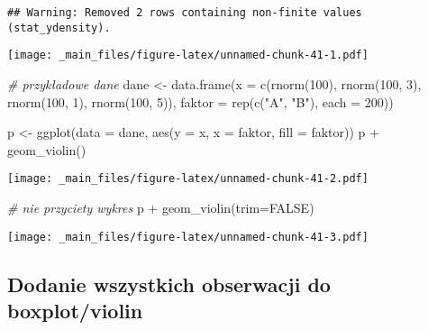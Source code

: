 \documentclass[
]{book}
\newenvironment{Shaded}{\begin{snugshade}}{\end{snugshade}}
\newcommand{\AttributeTok}[1]{\textcolor[rgb]{0.77,0.63,0.00}{#1}}
\newcommand{\CommentTok}[1]{\textcolor[rgb]{0.56,0.35,0.01}{\textit{#1}}}
\newcommand{\ConstantTok}[1]{\textcolor[rgb]{0.00,0.00,0.00}{#1}}
\newcommand{\DecValTok}[1]{\textcolor[rgb]{0.00,0.00,0.81}{#1}}
\newcommand{\FunctionTok}[1]{\textcolor[rgb]{0.00,0.00,0.00}{#1}}
\newcommand{\NormalTok}[1]{#1}
\newcommand{\OtherTok}[1]{\textcolor[rgb]{0.56,0.35,0.01}{#1}}
\newcommand{\SpecialCharTok}[1]{\textcolor[rgb]{0.00,0.00,0.00}{#1}}
\newcommand{\StringTok}[1]{\textcolor[rgb]{0.31,0.60,0.02}{#1}}
\begin{document}
\begin{verbatim}
## Warning: Removed 2 rows containing non-finite values (stat_ydensity).
\end{verbatim}

\texttt{[image: \_main\_files/figure-latex/unnamed-chunk-41-1.pdf]}

\begin{Shaded}
\begin{Highlighting}[]
\CommentTok{\# przykładowe dane}
\NormalTok{dane }\OtherTok{\textless{}{-}} \FunctionTok{data.frame}\NormalTok{(}\AttributeTok{x =} \FunctionTok{c}\NormalTok{(}\FunctionTok{rnorm}\NormalTok{(}\DecValTok{100}\NormalTok{), }\FunctionTok{rnorm}\NormalTok{(}\DecValTok{100}\NormalTok{, }\DecValTok{3}\NormalTok{), }\FunctionTok{rnorm}\NormalTok{(}\DecValTok{100}\NormalTok{, }\DecValTok{1}\NormalTok{), }\FunctionTok{rnorm}\NormalTok{(}\DecValTok{100}\NormalTok{, }\DecValTok{5}\NormalTok{)), }
                   \AttributeTok{faktor =} \FunctionTok{rep}\NormalTok{(}\FunctionTok{c}\NormalTok{(}\StringTok{"A"}\NormalTok{, }\StringTok{"B"}\NormalTok{), }\AttributeTok{each =} \DecValTok{200}\NormalTok{))}

\NormalTok{p }\OtherTok{\textless{}{-}} \FunctionTok{ggplot}\NormalTok{(}\AttributeTok{data =}\NormalTok{ dane, }\FunctionTok{aes}\NormalTok{(}\AttributeTok{y =}\NormalTok{ x, }\AttributeTok{x =}\NormalTok{ faktor, }\AttributeTok{fill =}\NormalTok{ faktor))}
\NormalTok{p }\SpecialCharTok{+} \FunctionTok{geom\_violin}\NormalTok{()}
\end{Highlighting}
\end{Shaded}

\texttt{[image: \_main\_files/figure-latex/unnamed-chunk-41-2.pdf]}

\begin{Shaded}
\begin{Highlighting}[]
\CommentTok{\# nie przyciety wykres}
\NormalTok{p }\SpecialCharTok{+} \FunctionTok{geom\_violin}\NormalTok{(}\AttributeTok{trim=}\ConstantTok{FALSE}\NormalTok{)}
\end{Highlighting}
\end{Shaded}

\texttt{[image: \_main\_files/figure-latex/unnamed-chunk-41-3.pdf]}

\hypertarget{dodanie-wszystkich-obserwacji-do-boxplotviolin}{%
\subsection{Dodanie wszystkich obserwacji do boxplot/violin}\label{dodanie-wszystkich-obserwacji-do-boxplotviolin}}
\end{document}
